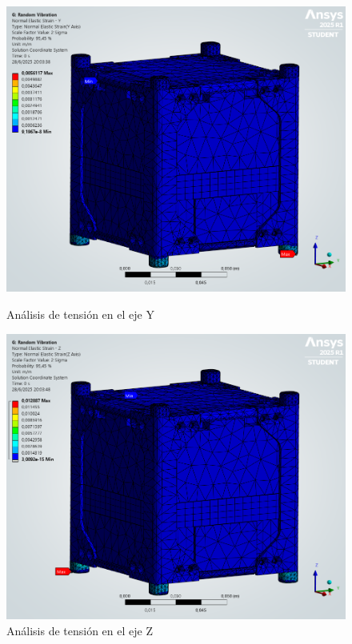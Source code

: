       \begin{figure}[H]
        \begin{minipage}{0.5\textwidth}
          \centering
          \includegraphics[width=\textwidth]{image/fem/ansys_cubesat-vibration_strain-y.png}
          \caption{Análisis de tensión en el eje Y}
          \label{fig:fem_strain-y}
        \end{minipage}
        \begin{minipage}{0.5\textwidth}
          \centering
          \includegraphics[width=\textwidth]{image/fem/ansys_cubesat-vibration_strain-z.png}
          \caption{Análisis de tensión en el eje Z}
          \label{fig:fem_strain-z}
        \end{minipage}
      \end{figure}

